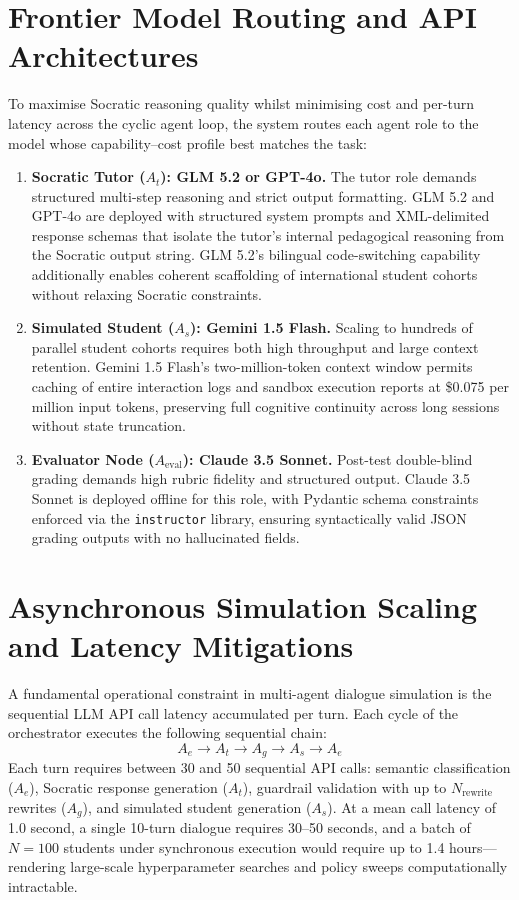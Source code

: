 \documentclass[11pt,a4paper]{report}
\begin{document}
\section{Frontier Model Routing and API Architectures}
To maximise Socratic reasoning quality whilst minimising cost and per-turn latency across the cyclic agent loop, the system routes each agent role to the model whose capability--cost profile best matches the task:
\begin{enumerate}
    \item \textbf{Socratic Tutor ($A_t$): GLM 5.2 or GPT-4o.}
    The tutor role demands structured multi-step reasoning and strict output formatting. GLM 5.2 and GPT-4o are deployed with structured system prompts and XML-delimited response schemas that isolate the tutor's internal pedagogical reasoning from the Socratic output string. GLM 5.2's bilingual code-switching capability additionally enables coherent scaffolding of international student cohorts without relaxing Socratic constraints.
    \item \textbf{Simulated Student ($A_s$): Gemini 1.5 Flash.}
    Scaling to hundreds of parallel student cohorts requires both high throughput and large context retention. Gemini 1.5 Flash's two-million-token context window permits caching of entire interaction logs and sandbox execution reports at \$0.075 per million input tokens, preserving full cognitive continuity across long sessions without state truncation.
    \item \textbf{Evaluator Node ($A_{\text{eval}}$): Claude 3.5 Sonnet.}
    Post-test double-blind grading demands high rubric fidelity and structured output. Claude 3.5 Sonnet is deployed offline for this role, with Pydantic schema constraints enforced via the \texttt{instructor} library, ensuring syntactically valid JSON grading outputs with no hallucinated fields.
\end{enumerate}

\section{Asynchronous Simulation Scaling and Latency Mitigations}
A fundamental operational constraint in multi-agent dialogue simulation is the sequential LLM API call latency accumulated per turn. Each cycle of the orchestrator executes the following sequential chain:
\begin{equation}
    A_e \longrightarrow A_t \longrightarrow A_g \longrightarrow A_s \longrightarrow A_e
\end{equation}
Each turn requires between 30 and 50 sequential API calls: semantic classification ($A_e$), Socratic response generation ($A_t$), guardrail validation with up to $N_{\text{rewrite}}$ rewrites ($A_g$), and simulated student generation ($A_s$). At a mean call latency of 1.0 second, a single 10-turn dialogue requires 30--50 seconds, and a batch of $N = 100$ students under synchronous execution would require up to 1.4 hours---rendering large-scale hyperparameter searches and policy sweeps computationally intractable.
\end{document}
